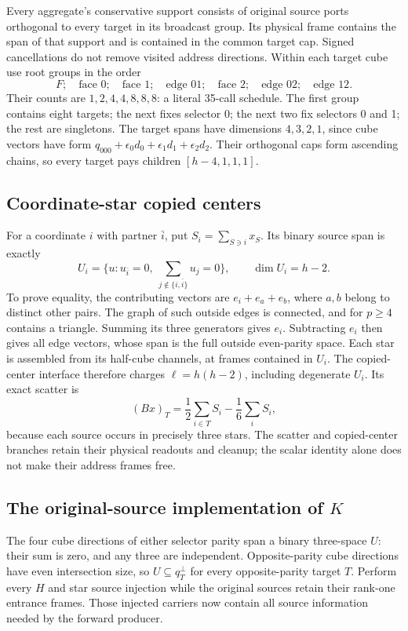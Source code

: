 Every aggregate's conservative support consists of original source
ports orthogonal to every target in its broadcast group. Its physical
frame contains the span of that support and is contained in the common
target cap. Signed cancellations do not remove visited address directions.
Within each target cube use root groups in the order
\[
 F;\quad\text{face }0;\quad\text{face }1;\quad\text{edge }01;
 \quad\text{face }2;\quad\text{edge }02;\quad\text{edge }12.
\]
Their counts are $1,2,4,4,8,8,8$: a literal 35-call schedule.
The first group contains eight targets; the next fixes selector 0;
the next two fix selectors 0 and 1; the rest are singletons.
The target spans have dimensions $4,3,2,1$, since cube vectors have
form $q_{000}+\epsilon_0d_0+\epsilon_1d_1+\epsilon_2d_2$.
Their orthogonal caps form ascending chains, so every target pays
children $[h-4,1,1,1]$.

\subsection{Coordinate-star copied centers}
For a coordinate $i$ with partner $\bar i$, put
$S_i=\sum_{S\ni i}x_S$. Its binary source span is exactly
\[
 U_i=\{u:u_{\bar i}=0,\ \sum_{j\notin\{i,\bar i\}}u_j=0\},
 \qquad \dim U_i=h-2.
\]
To prove equality, the contributing vectors are $e_i+e_a+e_b$,
where $a,b$ belong to distinct other pairs. The graph of such outside
edges is connected, and for $p\ge4$ contains a triangle.
Summing its three generators gives $e_i$. Subtracting $e_i$ then
gives all edge vectors, whose span is the full outside even-parity space.
Each star is assembled from its half-cube channels, at frames contained
in $U_i$. The copied-center interface therefore charges
$\ell=h(h-2)$, including degenerate $U_i$.
Its exact scatter is
\[
 (Bx)_T=\frac12\sum_{i\in T}S_i-\frac16\sum_iS_i,
\]
because each source occurs in precisely three stars. The scatter and
copied-center branches retain their physical readouts and cleanup;
the scalar identity alone does not make their address frames free.

\subsection{The original-source implementation of $K$}
The four cube directions of either selector parity span a binary
three-space $U$: their sum is zero, and any three are independent.
Opposite-parity cube directions have even intersection size, so
$U\subseteq q_T^\perp$ for every opposite-parity target $T$.
Perform every $H$ and star source injection while the original sources
retain their rank-one entrance frames. Those injected carriers now
contain all source information needed by the forward producer.

